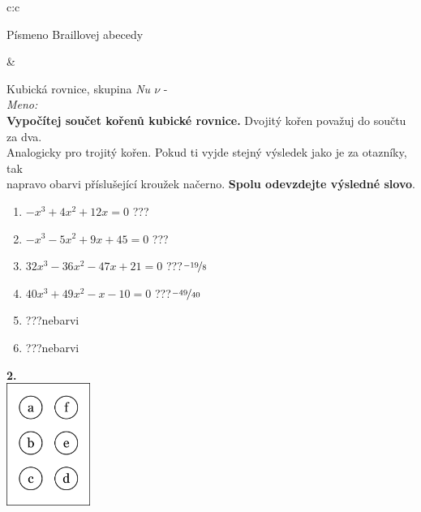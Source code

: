 \documentclass[10pt]{report}
\begin{document}
\begin{tabular}{c:c}
\begin{minipage}[c][99mm][t]{0.49\linewidth}
\begin{center}
\begin{minipage}{0.20\linewidth}
\begin{center}
{\small Písmeno Braillovej abecedy}
\end{center}
\end{minipage}
\end{center}
\end{minipage}
&
\begin{minipage}[c][99mm][t]{0.49\linewidth}
\begin{center}
\vspace{7mm}
{\huge Kubická rovnice, skupina \textit{Nu $\nu$} -}\\[4.5mm]
\textit{Meno:}\phantom{xxxxxxxxxxxxxxxxxxxxxxxxxxxxxxxxxxxxxxxxxxxxxxxxxxxxxxxxxxxxxxxxx}\\[3.5mm]
\textbf{Vypočítej součet kořenů kubické rovnice.} Dvojitý kořen považuj do součtu za dva.\\Analogicky pro trojitý kořen. Pokud ti vyjde stejný výsledek jako je za otazníky, tak\\napravo obarvi příslušející kroužek načerno. \textbf{Spolu odevzdejte výsledné slovo}.\\[3mm]
\begin{minipage}{0.77\linewidth}
\begin{center}
\begin{varwidth}{\textwidth}
\begin{enumerate}
\large
\item $-x^3+4x^2+12x=0$\quad \dotfill\; ???\;\dotfill {}
\item $-x^3-5x^2+9x+45=0$\quad \dotfill\; ???\;\dotfill {}
\item $32x^3-36x^2-47x+21=0$\quad \dotfill\; ???\;\dotfill \quad $\nicefrac{-19}{8}$
\item $40x^3+49x^2-x-10=0$\quad \dotfill\; ???\;\dotfill \quad $\nicefrac{-49}{40}$
\item \quad \dotfill\; ???\;\dotfill \quad nebarvi
\item \quad \dotfill\; ???\;\dotfill \quad nebarvi
\end{enumerate}
\end{varwidth}
\end{center}
\end{minipage}
\begin{minipage}{0.20\linewidth}
\begin{center}
{\Huge\bfseries 2.} \\[2mm]
\includegraphics[height=40mm]{../images/braille.png}

\end{center}
\end{minipage}
\end{center}
\end{minipage}
\end{tabular}
\end{document}
